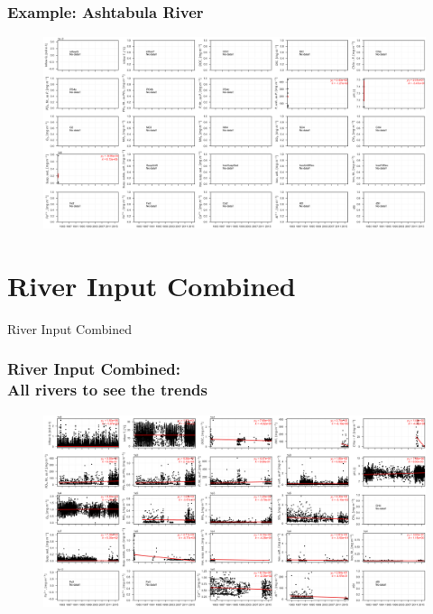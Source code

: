 \documentclass{beamer}
\begin{document}
\begin{frame}
\frametitle{Example: Ashtabula River}
\begin{figure}
\includegraphics[width=\textwidth]{rivers/Central basin/plot_all ashtabulariver.png}
\end{figure}
\end{frame}

\section{River Input Combined}

\begin{frame}
\begin{center}
\Huge River Input Combined
\end{center}
\end{frame}



\begin{frame}
\frametitle{River Input Combined: \\ All rivers to see the trends}
\begin{figure}
\includegraphics[width=\textwidth]{rivers/all/all_years all_rivers_subplots.png}
\end{figure}
\end{frame}
\end{document}
